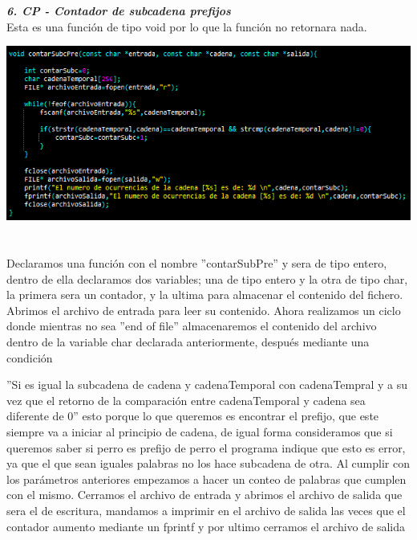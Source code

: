 \documentclass[12pt,letterpaper]{report}
\begin{document}
\textbf{\textit{ 6. CP - Contador de subcadena prefijos}}\\

Esta es una función de tipo void por lo que la función no retornara nada.
\begin{multicols}{2}
\includegraphics[scale=0.5]{punto6}\\\\
\\Declaramos una función con el nombre ''contarSubPre'' y sera de tipo entero, dentro de ella declaramos dos variables; una de tipo entero y la otra de tipo char, la primera sera un contador, y la ultima para almacenar el contenido del fichero. Abrimos el archivo de entrada para leer su contenido. Ahora realizamos un ciclo donde mientras no sea ''end of file'' almacenaremos el contenido del archivo dentro de la variable char declarada anteriormente, después mediante una condición
\end{multicols}
 ''Si es igual la subcadena de cadena y cadenaTemporal con cadenaTempral y a su vez que el retorno de la comparación entre cadenaTemporal y cadena sea diferente de 0'' esto porque lo que queremos es encontrar el prefijo, que este siempre va a iniciar al principio de cadena, de igual forma consideramos que si queremos saber si perro es prefijo de perro el programa indique que esto es error, ya que el que sean iguales palabras no los hace subcadena de otra. Al cumplir con los parámetros anteriores empezamos a hacer un conteo de palabras que cumplen con el mismo. Cerramos el archivo de entrada y abrimos el archivo de salida que sera el de escritura, mandamos a imprimir en el archivo de salida las veces que el contador aumento mediante un fprintf y por ultimo cerramos el archivo de salida
\end{document}
